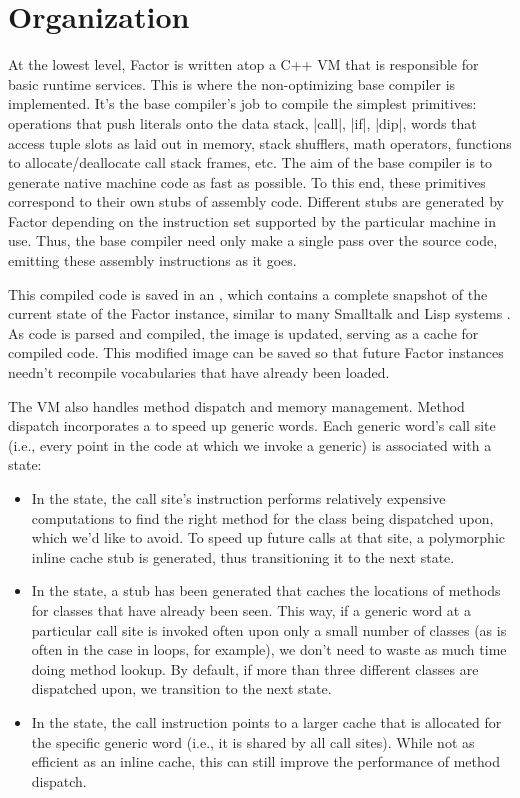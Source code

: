 \section{Organization}\label{sec:compiler:vm}

At the lowest level, Factor is written atop a C++ \gls{VM} that is responsible
for basic runtime services.  This is where the non-optimizing base compiler is
implemented.  It's the base compiler's job to compile the simplest primitives:
operations that push literals onto the data stack, \factor|call|, \factor|if|,
\factor|dip|, words that access tuple slots as laid out in memory, stack
shufflers, math operators, functions to allocate/deallocate call stack frames,
etc.  The aim of the base compiler is to generate native machine code as fast
as possible.  To this end, these primitives correspond to their own stubs of
assembly code.  Different stubs are generated by Factor depending on the
instruction set supported by the particular machine in use.  Thus, the base
compiler need only make a single pass over the source code, emitting these
assembly instructions as it goes.

This compiled code is saved in an , which contains a complete
snapshot of the current state of the Factor instance, similar to many Smalltalk
and Lisp systems \autocite{DLS}.  As code is parsed and compiled, the image is
updated, serving as a cache for compiled code.  This modified image can be
saved so that future Factor instances needn't recompile vocabularies that have
already been loaded.

The \gls{VM} also handles method dispatch and memory management.  Method
dispatch incorporates a  to speed up generic
words.  Each generic word's call site (i.e., every point in the code at which
we invoke a generic) is associated with a state:
\begin{itemize}
  \item In the  state, the call site's instruction performs
        relatively expensive computations to find the right method for the
        class being dispatched upon, which we'd like to avoid.  To speed up
        future calls at that site, a polymorphic inline cache stub is
        generated, thus transitioning it to the next state.
  \item In the  state, a stub has been generated that caches
        the locations of methods for classes that have already been seen.  This
        way, if a generic word at a particular call site is invoked often upon
        only a small number of classes (as is often in the case in loops, for
        example), we don't need to waste as much time doing method lookup.  By
        default, if more than three different classes are dispatched upon, we
        transition to the next state.
  \item In the  state, the call instruction points to a
        larger cache that is allocated for the specific generic word (i.e., it
        is shared by all call sites).  While not as efficient as an inline
        cache, this can still improve the performance of method dispatch.
\end{itemize}

